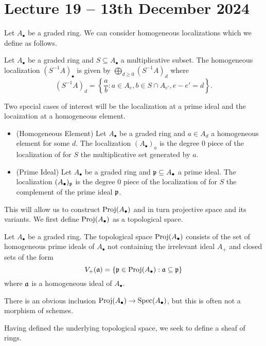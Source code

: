 \section{Lecture 19 -- 13th December 2024}\label{sec: lecture 19}
Let $A_{\bullet}$ be a graded ring. We can consider homogeneous localizations which we define as follows. 
\begin{definition}\label{def: homogeneous localization}
    Let $A_{\bullet}$ be a graded ring and $S\subseteq A_{\bullet}$ a multiplicative subset. The homogeneous localization $(S^{-1}A)_{\bullet}$ is given by $\bigoplus_{d\geq0}(S^{-1}A)_{d}$ where 
    $$(S^{-1}A)_{d}=\left\{\frac{a}{b}: a\in A_{e}, b\in S\cap A_{e'}, e-e'=d\right\}.$$
\end{definition}
Two special cases of interest will be the localization at a prime ideal and the locaization at a homogeneous element. 
\begin{itemize}
    \item (Homogeneous Element) Let $A_{\bullet}$ be a graded ring and $a\in A_{d}$ a homogeneous element for some $d$. The localization $(A_{\bullet})_{a}$ is the degree 0 piece of the localization of  for $S$ the multiplicative set generated by $a$.
    \item (Prime Ideal) Let $A_{\bullet}$ be a graded ring and $\mathfrak{p}\subseteq A_{\bullet}$ a prime ideal. The localization $(A_{\bullet})_{\mathfrak{p}}$ is the degree 0 piece of the localization of  for $S$ the complement of the prime ideal $\mathfrak{p}$. 
\end{itemize}
This will allow us to construct $\operatorname{Proj}(A_{\bullet})$ and in turn projective space and its variants. We first define $\operatorname{Proj}(A_{\bullet})$ as a topological space. 
\begin{definition}\label{def: proj space}
    Let $A_{\bullet}$ be a graded ring. The topological space $\operatorname{Proj}(A_{\bullet})$ consists of the set of homogeneous prime ideals of $A_{\bullet}$ not containing the irrelevant ideal $A_{+}$ and closed sets of the form 
    $$V_{+}(\mathfrak{a})=\{\mathfrak{p}\in\operatorname{Proj}(A_{\bullet}):\mathfrak{a}\subseteq\mathfrak{p}\}$$
    where $\mathfrak{a}$ is a homogeneous ideal of $A_{\bullet}$. 
\end{definition}
\begin{remark}
    There is an obvious inclusion $\operatorname{Proj}(A_{\bullet})\to\operatorname{Spec}(A_{\bullet})$, but this is often not a morphism of schemes. 
\end{remark}
Having defined the underlying topological space, we seek to define a sheaf of rings. 
